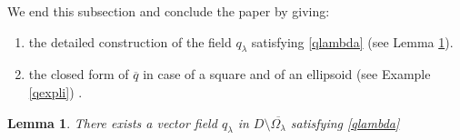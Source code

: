 \documentclass[reqno,11pt]{amsart}
\newtheorem{lemma}[theorem]{Lemma}
\theoremstyle{definition}
\numberwithin{equation}{section}
\def\ov{\overline}
\newcommand{\RR}{\mathbb{R}}
\newcommand{\1}{{{\bf 1}\kern-0,28em\rm l}}
\def\l{\lambda}
\begin{document}
%
%

\bigskip
We end this subsection and conclude the paper by giving:

\begin{enumerate}
\item [-] the detailed construction of the field $q_\l$ satisfying \eqref{qlambda} (see Lemma \ref{last}).
\item [-] the closed form of $\ov q$ in case of a square and of an ellipsoid (see Example \ref{qexpli}) .

\end{enumerate}
 











\begin{lemma}\label{last}
There exists a vector field $q_\lambda$ in $D\setminus\ov{\Omega_\lambda}$ satisfying \eqref{qlambda}

\end{lemma}
\end{document}
